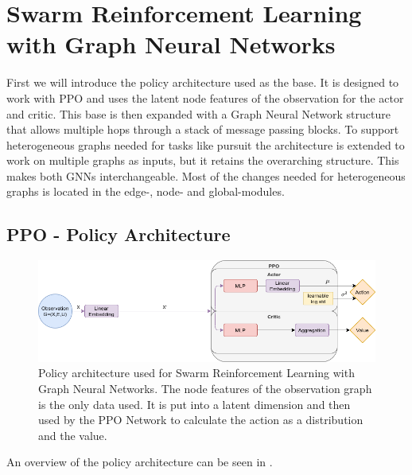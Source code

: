 
\chapter{Swarm Reinforcement Learning with Graph Neural Networks}
\label{ch:Architecture}
First we will introduce the policy architecture used as the base. It is designed to work with PPO and uses the latent node features of the observation for the actor and critic. This base is then expanded with a Graph Neural Network structure that allows multiple hops through a stack of message passing blocks. To support heterogeneous graphs needed for tasks like pursuit the architecture is extended to work on multiple graphs as inputs, but it retains the overarching structure. This makes both GNNs interchangeable. Most of the changes needed for heterogeneous graphs is located in the edge-, node- and global-modules.



\section{PPO - Policy Architecture}
\begin{figure}[htp]
    \centering
    \includegraphics[width=1.0\textwidth]{figures/PPO_no_message_passing.png}
    \hspace{1cm}   
    \caption{Policy architecture used for Swarm Reinforcement Learning with Graph Neural Networks. The node features of the observation graph is the only data used. It is put into a latent dimension and then used by the PPO Network to calculate the action as a distribution and the value.}
    \label{fig:PPO_no_message_passing}
\end{figure}

An overview of the policy architecture can be seen in .

